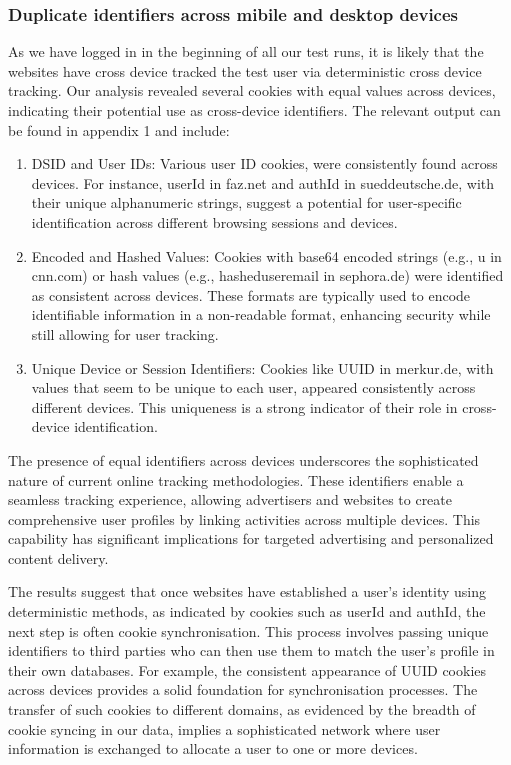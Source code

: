 \subsubsection{Duplicate identifiers across mibile and desktop devices}
As we have logged in in the beginning of all our test runs, it is likely that the websites have cross device tracked the test user via deterministic cross device tracking. Our analysis revealed several cookies with equal values across devices, indicating their potential use as cross-device identifiers. The relevant output can be found in appendix 1 and include:
\begin{enumerate}
    \item DSID and User IDs: Various user ID cookies, were consistently found across devices. For instance, userId in faz.net and authId in sueddeutsche.de, with their unique alphanumeric strings, suggest a potential for user-specific identification across different browsing sessions and devices.
    \item Encoded and Hashed Values: Cookies with base64 encoded strings (e.g., u in cnn.com) or hash values (e.g., hasheduseremail in sephora.de) were identified as consistent across devices. These formats are typically used to encode identifiable information in a non-readable format, enhancing security while still allowing for user tracking.
    \item Unique Device or Session Identifiers: Cookies like UUID in merkur.de, with values that seem to be unique to each user, appeared consistently across different devices. This uniqueness is a strong indicator of their role in cross-device identification.
\end{enumerate}
The presence of equal identifiers across devices underscores the sophisticated nature of current online tracking methodologies. These identifiers enable a seamless tracking experience, allowing advertisers and websites to create comprehensive user profiles by linking activities across multiple devices. This capability has significant implications for targeted advertising and personalized content delivery.

The results suggest that once websites have established a user's identity using deterministic methods, as indicated by cookies such as userId and authId, the next step is often cookie synchronisation. This process involves passing unique identifiers to third parties who can then use them to match the user's profile in their own databases. For example, the consistent appearance of UUID cookies across devices provides a solid foundation for synchronisation processes. The transfer of such cookies to different domains, as evidenced by the breadth of cookie syncing in our data, implies a sophisticated network where user information is exchanged to allocate a user to one or more devices.

